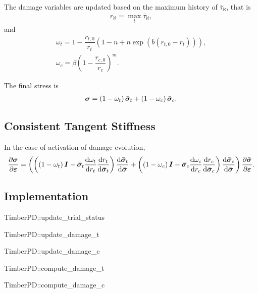 The damage variables are updated based on the maximum history of $\bar{\tau}_{\aleph}$, that is
\begin{gather}
r_\aleph=\max_t\bar{\tau}_{\aleph},
\end{gather}
and
\begin{gather}
\omega_t=1-\dfrac{r_{t,0}}{r_t}\left(1-n+n\exp\left(b\left(r_{t,0}-r_t\right)\right)\right),\\
\omega_c=\beta\left(1-\dfrac{r_{c,0}}{r_c}\right)^m.
\end{gather}

The final stress is
\begin{gather}
\bm{\sigma}=\left(1-\omega_t\right)\bar{\bm{\sigma}}_t+\left(1-\omega_c\right)\bar{\bm{\sigma}}_c.
\end{gather}
\subsection{Consistent Tangent Stiffness}
In the case of activation of damage evolution,
\begin{gather}
\dfrac{\partial{\bm{\sigma}}}{\partial{\bm{\varepsilon}}}=\left(\left(\left(1-\omega_t\right)\bm{I}-\bar{\bm{\sigma}}_t\dfrac{\mathrm{d}\omega_t}{\mathrm{d}r_t}\dfrac{\mathrm{d}r_t}{\mathrm{d}\bar{\bm{\sigma}}_t}\right)\dfrac{\mathrm{d}\bar{\bm{\sigma}}_t}{\mathrm{d}\bar{\bm{\sigma}}}
+\left(\left(1-\omega_c\right)\bm{I}-\bar{\bm{\sigma}}_c\dfrac{\mathrm{d}\omega_c}{\mathrm{d}r_c}\dfrac{\mathrm{d}r_c}{\mathrm{d}\bar{\bm{\sigma}}_c}\right)\dfrac{\mathrm{d}\bar{\bm{\sigma}}_c}{\mathrm{d}\bar{\bm{\sigma}}}\right)\dfrac{\partial{\bar{\bm{\sigma}}}}{\partial{\bm{\varepsilon}}}.
\end{gather}
\subsection{Implementation}
\begin{cppcode}
TimberPD::update_trial_status
\end{cppcode}

\begin{cppcode}
TimberPD::update_damage_t
\end{cppcode}

\begin{cppcode}
TimberPD::update_damage_c
\end{cppcode}

\begin{cppcode}
TimberPD::compute_damage_t
\end{cppcode}

\begin{cppcode}
TimberPD::compute_damage_c
\end{cppcode}
